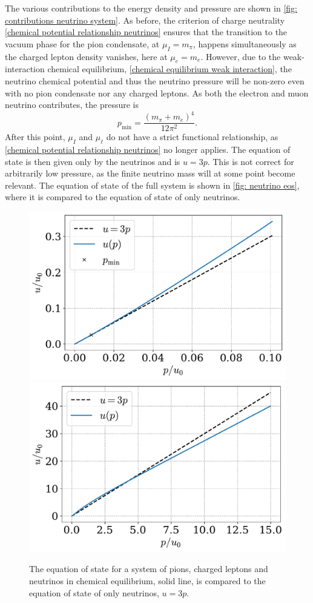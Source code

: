 The various contributions to the energy density and pressure are shown in \autoref{fig: contributions neutrino system}.
As before, the criterion of charge neutrality \autoref{chemical potential relationship neutrinos} ensures that the transition to the vacuum phase for the pion condensate, at $\mu_I = m_\pi$, happens simultaneously as the charged lepton density vanishes, here at $\mu_e = m_e$.
However, due to the weak-interaction chemical equilibrium, \autoref{chemical equilibrium weak interaction}, the neutrino chemical potential and thus the neutrino pressure will be non-zero even with no pion condensate nor any charged leptons. 
As both the electron and muon neutrino contributes, the pressure is
%
\begin{equation}
    \label{p min}
    p_\text{min} = \frac{(m_\pi+m_e)^4}{12 \pi^2}.
\end{equation}
%
After this point, $\mu_I$ and $\mu_\ell$ do not have a strict functional relationship, as \autoref{chemical potential relationship neutrinos} no longer applies.
The equation of state is then given only by the neutrinos and is $u = 3p$.
This is not correct for arbitrarily low pressure, as the finite neutrino mass will at some point become relevant.
The equation of state of the full system is shown in \autoref{fig: neutrino eos}, where it is compared to the equation of state of only neutrinos.

\begin{figure}[!htb]
    \centering
    \includegraphics[width=.5\textwidth]{../scripts/figurer/neutrino_eos2.pdf}
    \includegraphics[width=.49\textwidth]{../scripts/figurer/neutrino_eos.pdf}
    \caption{
        The equation of state for a system of pions, charged leptons and neutrinos in chemical equilibrium, solid line, is compared to the equation of state of only neutrinos, $u = 3 p$.
    }
    \label{fig: neutrino eos}
\end{figure}

